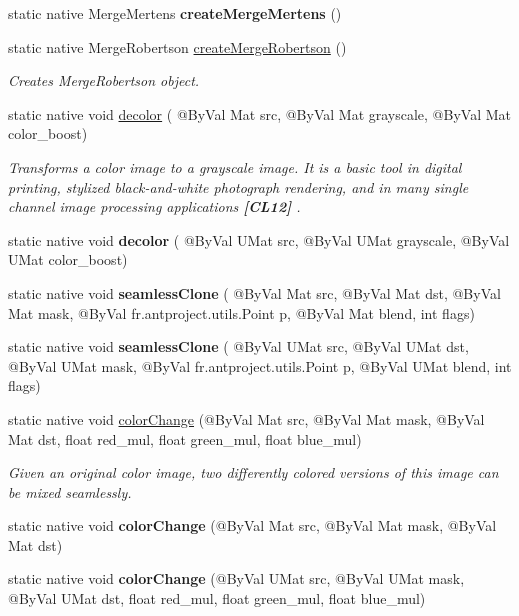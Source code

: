 \begin{DoxyCompactItemize}
static native Merge\+Mertens {\bfseries create\+Merge\+Mertens} ()
\item 
static native Merge\+Robertson \hyperlink{group__photo__hdr_ga658fdc1c45f60d70951e9364b7a974ae}{create\+Merge\+Robertson} ()
\begin{DoxyCompactList}\small\item\em Creates Merge\+Robertson object. \end{DoxyCompactList}\item 
static native void \hyperlink{group__photo_ga51c7b45dade866b4280660a0a0842dbc}{decolor} ( @By\+Val Mat src, @By\+Val Mat grayscale, @By\+Val Mat color\+\_\+boost)
\begin{DoxyCompactList}\small\item\em Transforms a color image to a grayscale image. It is a basic tool in digital printing, stylized black-\/and-\/white photograph rendering, and in many single channel image processing applications {\bfseries [C\+L12]} . \end{DoxyCompactList}\item 
static native void {\bfseries decolor} ( @By\+Val U\+Mat src, @By\+Val U\+Mat grayscale, @By\+Val U\+Mat color\+\_\+boost)
\item 
static native void {\bfseries seamless\+Clone} ( @By\+Val Mat src, @By\+Val Mat dst, @By\+Val Mat mask, @By\+Val fr.antproject.utils.Point p, @By\+Val Mat blend, int flags)
\item 
static native void {\bfseries seamless\+Clone} ( @By\+Val U\+Mat src, @By\+Val U\+Mat dst, @By\+Val U\+Mat mask, @By\+Val fr.antproject.utils.Point p, @By\+Val U\+Mat blend, int flags)
\item 
static native void \hyperlink{group__photo__clone_ga3560d162cd540795fe14ae7e98a7a9a2}{color\+Change} (@By\+Val Mat src, @By\+Val Mat mask, @By\+Val Mat dst, float red\+\_\+mul, float green\+\_\+mul, float blue\+\_\+mul)
\begin{DoxyCompactList}\small\item\em Given an original color image, two differently colored versions of this image can be mixed seamlessly. \end{DoxyCompactList}\item 
static native void {\bfseries color\+Change} (@By\+Val Mat src, @By\+Val Mat mask, @By\+Val Mat dst)
\item 
static native void {\bfseries color\+Change} (@By\+Val U\+Mat src, @By\+Val U\+Mat mask, @By\+Val U\+Mat dst, float red\+\_\+mul, float green\+\_\+mul, float blue\+\_\+mul)
\item 

\end{DoxyCompactItemize}
